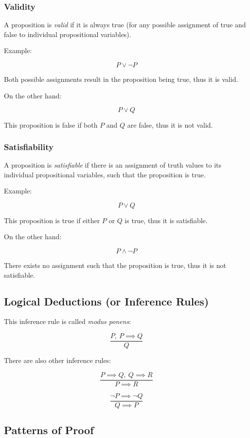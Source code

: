 \documentclass[../main.tex]{subfiles}
\begin{document}
\subsubsection{Validity}

A proposition is \textit{valid} if it is always true (for any possible assignment of true and false to individual propositional variables).

Example:

$$
P \lor \neg P
$$

Both possible assignments result in the proposition being true, thus it is valid.

On the other hand:

$$
P \lor Q
$$

This proposition is false if both $P$ and $Q$ are false, thus it is not valid.

\subsubsection{Satisfiability}

A proposition is \textit{satisfiable} if there is an assignment of truth values to its individual propositional variables, such that the proposition is true.

Example:

$$
P \lor Q
$$

This proposition is true if either $P$ or $Q$ is true, thus it is satisfiable.

On the other hand:

$$
P \land \neg P
$$

There exists no assignment such that the proposition is true, thus it is not satisfiable.

\subsection{Logical Deductions (or Inference Rules)}

This inference rule is called \textit{modus ponens}:

$$
\frac{P,\ P \implies Q}{Q}
$$

There are also other inference rules:

$$
\frac
{P \implies Q,\ Q \implies R}
{P \implies R}
$$

$$
\frac{\neg P \implies \neg Q}{Q \implies P}
$$

\subsection{Patterns of Proof}
\end{document}
